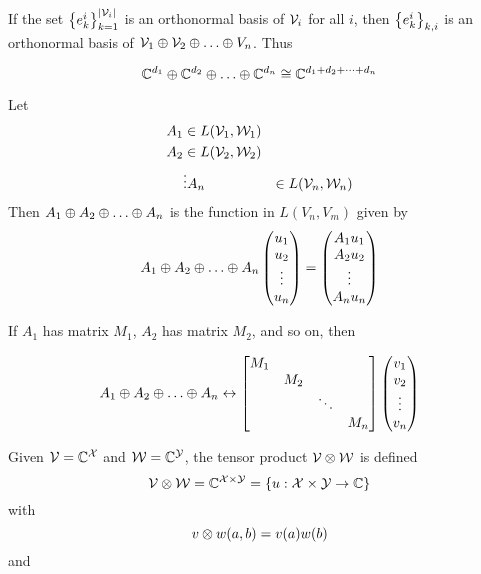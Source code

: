 If the set $\left\lbrace e_k^i\right\rbrace_{k=1}^{\left\lvert\mathcal{V}_i\right\rvert}$ is an orthonormal basis
of $\mathcal{V}_i$ for all $i$, then $\left\lbrace e_k^i\right\rbrace_{k,i}$ is an orthonormal basis
of $\vecspace{V}_1 \directsum \vecspace{V}_2 \directsum \dots \directsum{V}_n$. Thus

\[\complexnums^{d_1} \directsum \complexnums^{d_2} \directsum \dots \directsum \complexnums^{d_n} \isomorphic \complexnums^{d_1 + d_2 + \dots + d_n}\]

\begin{definition}
    Let
    \begin{align*}
        A_1 & \in L(\mathcal{V}_1, \mathcal{W}_1) \\
        A_2 & \in L(\mathcal{V}_2, \mathcal{W}_2) \\
            & \vdots
        A_n & \in L(\mathcal{V}_n, \mathcal{W}_n)
    \end{align*}
    Then $A_1 \directsum A_2 \directsum \dots \directsum A_n$ is the function in $L(V_n, V_m)$ given
    by
    \[A_1 \directsum A_2 \directsum \dots \directsum A_n\begin{pmatrix}u_1\\u_2\\\vdots\\u_n\end{pmatrix} = \begin{pmatrix}A_1u_1\\A_2u_2\\\vdots\\A_nu_n\end{pmatrix}\]
\end{definition}

If $A_1$ has matrix $M_1$, $A_2$ has matrix $M_2$, and so on, then

\[A_1 \directsum A_2 \directsum \dots \directsum A_n \leftrightarrow \begin{bmatrix}M_1\\ &M_2\\ & &\ddots\\ & & & M_n\end{bmatrix}\begin{pmatrix}v_1\\v_2\\\vdots\\v_n\end{pmatrix}\]

\begin{definition}
    Given $\mathcal{V} = \mathbb{C}^{\mathcal{X}}$ and $\mathcal{W} = \mathbb{C}^{\mathcal{Y}}$, the tensor product $\mathcal{V} \otimes \mathcal{W}$ is defined
    \[\mathcal{V} \otimes \mathcal{W} = \mathbb{C}^{\mathcal{X} \times \mathcal{Y}} = \left\lbrace u:\mathcal{X} \times \mathcal{Y} \to \mathbb{C}\right\rbrace\]
    with
    \[v \otimes w(a, b) = v(a)w(b)\]
    and
\end{definition}